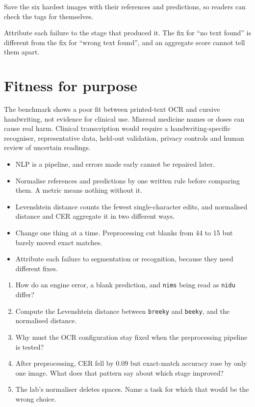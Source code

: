 Save the six hardest images with their references and predictions, so readers can check the tags for themselves.

\begin{keyidea}
Attribute each failure to the stage that produced it. The fix for ``no text found'' is different from the fix for ``wrong text found'', and an aggregate score cannot tell them apart.
\end{keyidea}

\section{Fitness for purpose}

The benchmark shows a poor fit between printed-text OCR and cursive handwriting, not evidence for clinical use. Misread medicine names or doses can cause real harm. Clinical transcription would require a handwriting-specific recogniser, representative data, held-out validation, privacy controls and human review of uncertain readings.

\begin{chapterrecap}
\begin{itemize}
  \item NLP is a pipeline, and errors made early cannot be repaired later.
  \item Normalise references and predictions by one written rule before comparing them. A metric means nothing without it.
  \item Levenshtein distance counts the fewest single-character edits, and normalised distance and CER aggregate it in two different ways.
  \item Change one thing at a time. Preprocessing cut blanks from 44 to 15 but barely moved exact matches.
  \item Attribute each failure to segmentation or recognition, because they need different fixes.
\end{itemize}
\end{chapterrecap}

\begin{quickcheck}
\begin{enumerate}
  \item How do an engine error, a blank prediction, and \texttt{nims} being read as \texttt{nidu} differ?
  \item Compute the Levenshtein distance between \texttt{breeky} and \texttt{beeky}, and the normalised distance.
  \item Why must the OCR configuration stay fixed when the preprocessing pipeline is tested?
  \item After preprocessing, CER fell by $0.09$ but exact-match accuracy rose by only one image. What does that pattern say about which stage improved?
  \item The lab's normaliser deletes spaces. Name a task for which that would be the wrong choice.
\end{enumerate}
\end{quickcheck}
